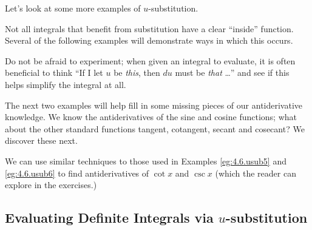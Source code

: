 Let's look at some more examples of $u$-substitution.


Not all integrals that benefit from substitution have a clear ``inside'' function. Several of the following examples will demonstrate ways in which this occurs.


Do not be afraid to experiment; when given an integral to evaluate, it is often beneficial to think ``If I let $u$ be \textit{this}, then $du$ must be \textit{that} \ldots'' and see if this helps simplify the integral at all.


The next two examples will help fill in some missing pieces of our antiderivative knowledge. We know the antiderivatives of the sine and cosine functions; what about the other standard functions tangent, cotangent, secant and cosecant? We discover these next.



We can use similar techniques to those used in Examples \ref{eg:4.6.usub5} and \ref{eg:4.6.usub6} to find antiderivatives of $\cot x$ and $\csc x$ (which the reader can explore in the exercises.)


\subsection*{Evaluating Definite Integrals via $u$-substitution}


